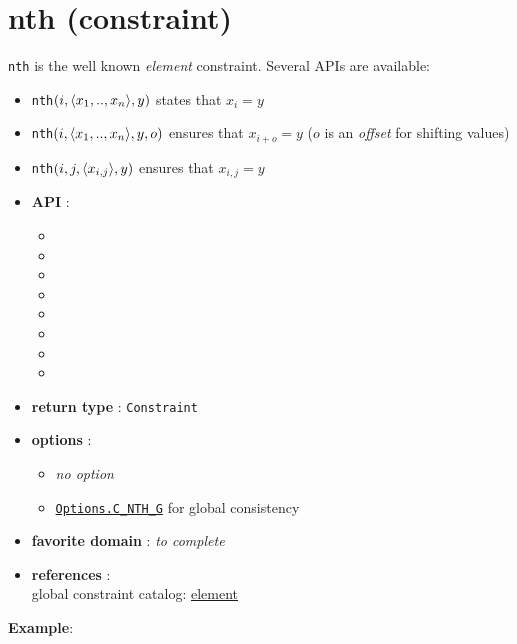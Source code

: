 \label{nth}
\hypertarget{nth}{}

\section{nth (constraint)}\label{nth:nthconstraint}\hypertarget{nth:nthconstraint}{}
\texttt{nth} is the well known \emph{element} constraint.
Several APIs are available: 
\begin{notedef}
\begin{itemize}
\item \texttt{nth}$(i,\langle x_1,..,x_n\rangle,y)$ states that $x_i=y$
\item \texttt{nth}$(i,\langle x_1,..,x_n\rangle,y,o)$ ensures that $x_{i+o}=y$ ($o$ is an \emph{offset} for shifting values)
\item \texttt{nth}$(i,j,\langle x_{i,j}\rangle,y)$ ensures that $x_{i,j}=y$
\end{itemize}
\end{notedef}

\begin{itemize}
	\item \textbf{API} :
	\begin{itemize}
		\item {}
		\item {}
		\item {}
		\item {}
		\item {}		
		\item {}
		\item {}
		\item {}
	\end{itemize}
	\item \textbf{return type} : \texttt{Constraint}
	\item \textbf{options} :
	\begin{itemize}
		\item \emph{no option} 
		\item \hyperlink{cnthg:cnthgoptions}{\tt Options.C\_NTH\_G} for global consistency
	\end{itemize}
	\item \textbf{favorite domain} : \emph{to complete}
	\item \textbf{references} :\\
      global constraint catalog: \href{http://www.emn.fr/x-info/sdemasse/gccat/Celement.html}{element}
\end{itemize}

\textbf{Example}:
 
